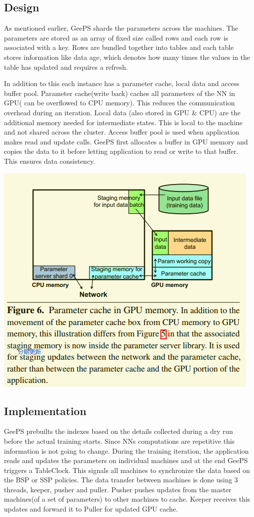 \documentclass[11pt]{article}
\begin{document}
\subsection{Design}
\label{sec:orgd3abe9f}
As mentioned earlier, GeePS shards the parameters across the machines. The parameters are stored as an array of fixed size called rows and each row is associated with a key. Rows are bundled together into tables and each table stores information like data age, which denotes how many times the values in the table has updated and requires a refresh.

In addition to this each instance has a parameter cache, local data and access buffer pool. Parameter cache(write back) caches all parameters of the NN in GPU( can be overflowed to CPU memory). This reduces the communication overhead during an iteration. Local data (also stored in GPU \& CPU) are the additional memory needed for intermediate states. This is local to the machine and not shared across the cluster. Access buffer pool is used when application makes read and update calls. GeePS first allocates a buffer in GPU memory and copies the data to it before letting application to read or write to that buffer. This ensures data consistency.

\begin{center}
\includegraphics[width=.9\linewidth]{GeePS.org_imgs/20201117_203549_laJAue.png}
\end{center}
\subsection{Implementation}
\label{sec:org17bc915}
GeePS prebuilts the indexes based on the details collected during a dry run before the actual training starts. Since NNs computations are repetitive this information is not going to change. During the training iteration, the application reads and updates the parameters on individual machines and at the end GeePS triggers a TableClock. This signals all machines to synchronize the data based on the BSP or SSP policies. The data transfer between machines is done using 3 threads, keeper, pusher and puller. Pusher pushes updates from the master machines(of a set of parameters) to other machines to cache. Keeper receives this updates and forward it to Puller for updated GPU cache.
\end{document}

